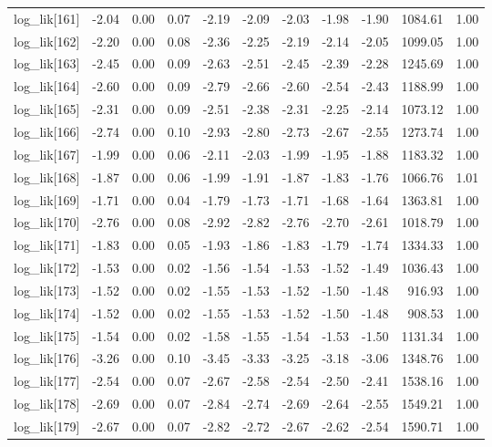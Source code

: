 \begin{table}[ht]
\begin{tabular}{rrrrrrrrrrr}
  log\_lik[161] & -2.04 & 0.00 & 0.07 & -2.19 & -2.09 & -2.03 & -1.98 & -1.90 & 1084.61 & 1.00 \\ 
  log\_lik[162] & -2.20 & 0.00 & 0.08 & -2.36 & -2.25 & -2.19 & -2.14 & -2.05 & 1099.05 & 1.00 \\ 
  log\_lik[163] & -2.45 & 0.00 & 0.09 & -2.63 & -2.51 & -2.45 & -2.39 & -2.28 & 1245.69 & 1.00 \\ 
  log\_lik[164] & -2.60 & 0.00 & 0.09 & -2.79 & -2.66 & -2.60 & -2.54 & -2.43 & 1188.99 & 1.00 \\ 
  log\_lik[165] & -2.31 & 0.00 & 0.09 & -2.51 & -2.38 & -2.31 & -2.25 & -2.14 & 1073.12 & 1.00 \\ 
  log\_lik[166] & -2.74 & 0.00 & 0.10 & -2.93 & -2.80 & -2.73 & -2.67 & -2.55 & 1273.74 & 1.00 \\ 
  log\_lik[167] & -1.99 & 0.00 & 0.06 & -2.11 & -2.03 & -1.99 & -1.95 & -1.88 & 1183.32 & 1.00 \\ 
  log\_lik[168] & -1.87 & 0.00 & 0.06 & -1.99 & -1.91 & -1.87 & -1.83 & -1.76 & 1066.76 & 1.01 \\ 
  log\_lik[169] & -1.71 & 0.00 & 0.04 & -1.79 & -1.73 & -1.71 & -1.68 & -1.64 & 1363.81 & 1.00 \\ 
  log\_lik[170] & -2.76 & 0.00 & 0.08 & -2.92 & -2.82 & -2.76 & -2.70 & -2.61 & 1018.79 & 1.00 \\ 
  log\_lik[171] & -1.83 & 0.00 & 0.05 & -1.93 & -1.86 & -1.83 & -1.79 & -1.74 & 1334.33 & 1.00 \\ 
  log\_lik[172] & -1.53 & 0.00 & 0.02 & -1.56 & -1.54 & -1.53 & -1.52 & -1.49 & 1036.43 & 1.00 \\ 
  log\_lik[173] & -1.52 & 0.00 & 0.02 & -1.55 & -1.53 & -1.52 & -1.50 & -1.48 & 916.93 & 1.00 \\ 
  log\_lik[174] & -1.52 & 0.00 & 0.02 & -1.55 & -1.53 & -1.52 & -1.50 & -1.48 & 908.53 & 1.00 \\ 
  log\_lik[175] & -1.54 & 0.00 & 0.02 & -1.58 & -1.55 & -1.54 & -1.53 & -1.50 & 1131.34 & 1.00 \\ 
  log\_lik[176] & -3.26 & 0.00 & 0.10 & -3.45 & -3.33 & -3.25 & -3.18 & -3.06 & 1348.76 & 1.00 \\ 
  log\_lik[177] & -2.54 & 0.00 & 0.07 & -2.67 & -2.58 & -2.54 & -2.50 & -2.41 & 1538.16 & 1.00 \\ 
  log\_lik[178] & -2.69 & 0.00 & 0.07 & -2.84 & -2.74 & -2.69 & -2.64 & -2.55 & 1549.21 & 1.00 \\ 
  log\_lik[179] & -2.67 & 0.00 & 0.07 & -2.82 & -2.72 & -2.67 & -2.62 & -2.54 & 1590.71 & 1.00 \\ 

\end{tabular}
\end{table}
